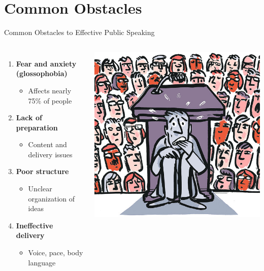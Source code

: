 \documentclass{beamer}
\begin{document}
\section{Common Obstacles}

\begin{frame}{Common Obstacles to Effective Public Speaking}
    \begin{columns}
        \begin{enumerate}
            \item \textbf{Fear and anxiety (glossophobia)}
                \begin{itemize}
                    \item Affects nearly 75\% of people
                \end{itemize}
            \item \textbf{Lack of preparation}
                \begin{itemize}
                    \item Content and delivery issues
                \end{itemize}
            \item \textbf{Poor structure}
                \begin{itemize}
                    \item Unclear organization of ideas
                \end{itemize}
            \item \textbf{Ineffective delivery}
                \begin{itemize}
                    \item Voice, pace, body language
                \end{itemize}
        \end{enumerate}
        
        \includegraphics[width=\textwidth]{images/obstacles.jpg}
    \end{columns}
\end{frame}
\end{document}
